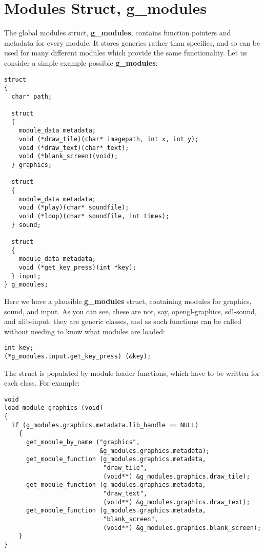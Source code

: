 \documentclass[12pt,a4paper]{article}
\begin{document}
\section{Modules Struct, g\_modules}

The global modules struct, \textbf{g\_modules}, contains function pointers and metadata for every module. It stores generics rather than specifics, and so can be used for many different modules which provide the same functionality. Let us consider a simple example possible \textbf{g\_modules}:

\begin{lstlisting}
struct
{
  char* path;

  struct
  {
    module_data metadata;
    void (*draw_tile)(char* imagepath, int x, int y);
    void (*draw_text)(char* text);
    void (*blank_screen)(void);
  } graphics;

  struct
  {
    module_data metadata;
    void (*play)(char* soundfile);
    void (*loop)(char* soundfile, int times);
  } sound;

  struct
  {
    module_data metadata;
    void (*get_key_press)(int *key);
  } input;
} g_modules;
\end{lstlisting}

Here we have a plausible \textbf{g\_modules} struct, containing modules for graphics, sound, and input. As you can see, these are not, say, opengl-graphics, sdl-sound, and xlib-input; they are generic classes, and as such functions can be called without needing to know what modules are loaded:

\begin{lstlisting}
int key;
(*g_modules.input.get_key_press) (&key);
\end{lstlisting}

The struct is populated by module loader functions, which have to be written for each class. For example:

\begin{lstlisting}
void
load_module_graphics (void)
{
  if (g_modules.graphics.metadata.lib_handle == NULL)
    {
      get_module_by_name ("graphics",
                          &g_modules.graphics.metadata);
      get_module_function (g_modules.graphics.metadata,
                           "draw_tile",
                           (void**) &g_modules.graphics.draw_tile);
      get_module_function (g_modules.graphics.metadata,
                           "draw_text",
                           (void**) &g_modules.graphics.draw_text);
      get_module_function (g_modules.graphics.metadata,
                           "blank_screen",
                           (void**) &g_modules.graphics.blank_screen);
    }
}
\end{lstlisting}
\end{document}
